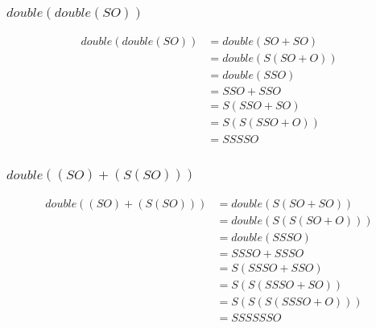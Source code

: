 \documentclass[a4paper, 12pt]{article}
\begin{document}
\subsubsection*{$double(double(S O))$}
%
\begin{align*}
    double(double(S O)) &= double(SO + SO) \tag*{[d.1; SO]}\\
    &= double(S(SO + O)) \tag*{[a.2; SO, O]}\\
    &= double(SSO) \tag*{[a.1; SO]}\\
    &= SSO + SSO \tag*{[d.1; SSO]}\\
    &= S(SSO + SO) \tag*{[a.2; SSO, SO]}\\
    &= S(S(SSO + O)) \tag*{[a.2; SSO, O]}\\
    &= SSSSO \tag*{[a.1; SSO]}\\
\end{align*}
%
\subsubsection*{$double ((S O) + (S (S O)))$}
%
\begin{align*}
    double ((S O) + (S (S O))) &= double(S(SO + SO)) \tag*{[a.2; SO, SO]}\\
    &= double(S(S(SO + O))) \tag*{[a.2; SO, O]}\\
    &= double(SSSO) \tag*{[a.1; SO]}\\
    &= SSSO + SSSO \tag*{[d.1; SSSO]}\\
    &= S(SSSO + SSO) \tag*{[a.2; SSSO, SSO]}\\
    &= S(S(SSSO + SO)) \tag*{[a.2; SSSO, SO]}\\
    &= S(S(S(SSSO + O))) \tag*{[a.2; SSSO, O]}\\
    &= SSSSSSO \tag*{[a.1; SSSO]}
\end{align*}
%
\end{document}
